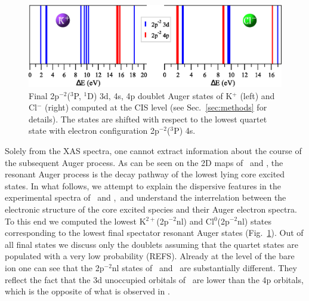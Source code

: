\begin{figure}[h!]
\centering
\includegraphics[scale=0.6]{figures/kcl_2p-2nl.eps}
\caption{Final 2p$^{-2}$($^3$P, $^1$D) 3d, 4s, 4p doublet Auger states of K$^{+}$ (left) and Cl$^{-}$ (right) computed at the CIS level (see Sec.\ \ref{sec:methods} for details). The states are shifted with respect to the lowest quartet state with electron configuration 2p$^{-2}$($^3$P) 4s.}
\label{fg:kcl_2p4nl}
\end{figure}


Solely from the XAS spectra, one cannot extract information about the course of the subsequent Auger process. As can be seen on the 2D maps of \ki~and \cli, the resonant Auger process is the decay pathway of the lowest lying core excited states. In what follows, we attempt to explain the dispersive features in the experimental spectra of \ki~and \cli,~and understand the interrelation between the electronic structure of the core excited species and their Auger electron spectra. To this end we computed the lowest K$^{2+}$(2p$^{-2}$nl) and Cl$^{0}$(2p$^{-2}$nl) states corresponding to the lowest final spectator resonant Auger states (Fig.\ \ref{fg:kcl_2p4nl}). Out of all final states we discuss only the doublets assuming that the quartet states are populated with a very low probability (REFS). Already at the level of the bare ion one can see that the 2p$^{-2}$nl states of \ki~and \cli~are substantially different. They reflect the fact that the 3d unoccupied orbitals of \ki~are lower than the 4p orbitals, which is the opposite of what is observed in \cli.


